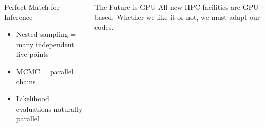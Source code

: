 \documentclass[aspectratio=169]{beamer}
\begin{document}
\begin{frame}
\begin{columns}
        \begin{block}{Perfect Match for Inference}
            \begin{itemize}
                \item Nested sampling = many independent live points
                \item MCMC = parallel chains
                \item Likelihood evaluations naturally parallel
            \end{itemize}
        \end{block}
        \vspace{-0.5em}

        \begin{alertblock}{The Future is GPU}
            All new HPC facilities are GPU-based. Whether we like it or not, we must adapt our codes.
        \end{alertblock}
    \end{columns}
\end{frame}
\end{document}
